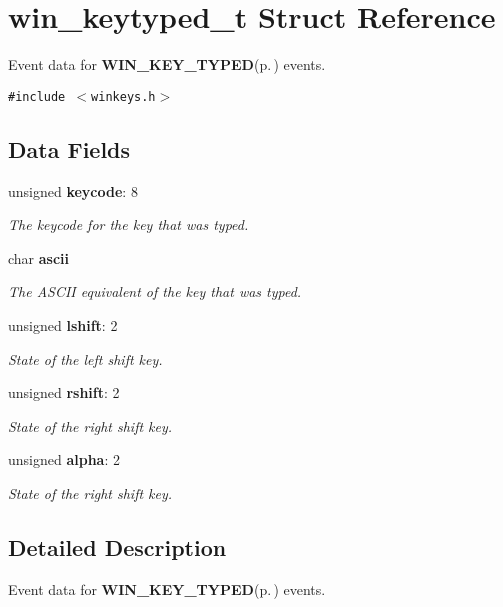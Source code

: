 \section{win\_\-keytyped\_\-t Struct Reference}
\label{structwin__keytyped__t}
Event data for {\bf WIN\_\-KEY\_\-TYPED}{\rm (p.\,\pageref{winkeys_8h_a2})} events.  


{\tt \#include $<$winkeys.h$>$}

\subsection*{Data Fields}
\begin{CompactItemize}
\item 
unsigned {\bf keycode}: 8
\begin{CompactList}\small\item\em The keycode for the key that was typed. \item\end{CompactList}\item 
char {\bf ascii}
\begin{CompactList}\small\item\em The ASCII equivalent of the key that was typed. \item\end{CompactList}\item 
unsigned {\bf lshift}: 2
\begin{CompactList}\small\item\em State of the left shift key. \item\end{CompactList}\item 
unsigned {\bf rshift}: 2
\begin{CompactList}\small\item\em State of the right shift key. \item\end{CompactList}\item 
unsigned {\bf alpha}: 2
\begin{CompactList}\small\item\em State of the right shift key. \item\end{CompactList}\end{CompactItemize}


\subsection{Detailed Description}
Event data for {\bf WIN\_\-KEY\_\-TYPED}{\rm (p.\,\pageref{winkeys_8h_a2})} events. 

